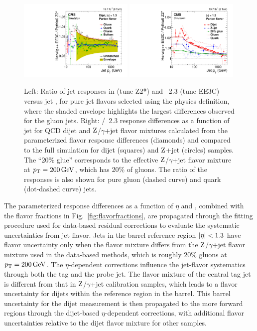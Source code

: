 \documentclass[11pt,twoside,a4paper,cmspaper,final,collab]{cms-tdr}
\begin{document}
\begin{figure}[htbp!]
\centering
\includegraphics[width=0.49\textwidth]{Figure_031-a.pdf}
\includegraphics[width=0.49\textwidth]{Figure_031-b.pdf}
\caption{\label{fig:flavor}
Left: Ratio of jet responses in  (tune Z2*) and \HERWIGpp~2.3 (tune EE3C) versus jet \pt, for pure jet flavors selected using the physics definition, where the shaded envelope highlights the largest differences observed for the gluon jets.
Right: /\HERWIGpp~2.3 response differences as a function of jet \pt for QCD dijet and $\mathrm{Z}$/$\gamma$+jet flavor mixtures calculated from the parameterized flavor response differences (diamonds) and compared to the full simulation for dijet (squares) and $\mathrm{Z}$+jet (circles) samples. The ``20\% glue'' corresponds to the effective $\mathrm{Z}$/$\gamma$+jet flavor mixture at $p_{\mathrm{T}}=200\,\text{Ge\hspace{-.08em}V}$, which has 20\% of gluons. The ratio of the responses is also shown for pure gluon (dashed curve) and quark (dot-dashed curve) jets.
}
\end{figure}

The parameterized response differences as a function of $\eta$ and \pt, combined with the flavor fractions in Fig.~\ref{fig:flavorfractions}, are propagated through the fitting procedure used for data-based residual corrections to evaluate the systematic uncertainties from jet flavor.
Jets in the barrel reference region $\lvert \eta \rvert<1.3$ have flavor uncertainty only when the flavor mixture differs from the $\mathrm{Z}$/$\gamma$+jet flavor mixture used in the data-based methods, which is roughly 20\% gluons at $p_{\mathrm{T}}=200\,\text{Ge\hspace{-.08em}V}$.
The $\eta$-dependent corrections influence the jet-flavor systematics through both the tag and the probe jet. The flavor mixture of the central tag jet is different from that in $\mathrm{Z}$/$\gamma$+jet calibration samples, which leads to a flavor uncertainty for dijets within the reference region in the barrel. This barrel uncertainty for the dijet measurement is then propagated to the more forward regions through the dijet-based $\eta$-dependent corrections, with additional flavor uncertainties relative to the dijet flavor mixture for other samples.
\end{document}
